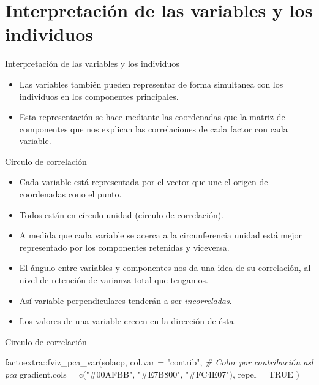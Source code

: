 \documentclass[
  ignorenonframetext,
]{beamer}
\newenvironment{Shaded}{\begin{snugshade}}{\end{snugshade}}
\newcommand{\AttributeTok}[1]{\textcolor[rgb]{0.77,0.63,0.00}{#1}}
\newcommand{\CommentTok}[1]{\textcolor[rgb]{0.56,0.35,0.01}{\textit{#1}}}
\newcommand{\ConstantTok}[1]{\textcolor[rgb]{0.00,0.00,0.00}{#1}}
\newcommand{\FunctionTok}[1]{\textcolor[rgb]{0.00,0.00,0.00}{#1}}
\newcommand{\NormalTok}[1]{#1}
\newcommand{\SpecialCharTok}[1]{\textcolor[rgb]{0.00,0.00,0.00}{#1}}
\newcommand{\StringTok}[1]{\textcolor[rgb]{0.31,0.60,0.02}{#1}}
\providecommand{\tightlist}{%
  \setlength{\itemsep}{0pt}\setlength{\parskip}{0pt}}
\begin{document}
\hypertarget{interpretaciuxf3n-de-las-variables-y-los-individuos}{%
\section{Interpretación de las variables y los
individuos}\label{interpretaciuxf3n-de-las-variables-y-los-individuos}}

\begin{frame}{Interpretación de las variables y los individuos}
\protect\hypertarget{interpretaciuxf3n-de-las-variables-y-los-individuos-1}{}
\begin{itemize}
\item
  Las variables también pueden representar de forma simultanea con los
  individuos en los componentes principales.
\item
  Esta representación se hace mediante las coordenadas que la matriz de
  componentes que nos explican las correlaciones de cada factor con cada
  variable.
\end{itemize}
\end{frame}

\begin{frame}{Circulo de correlación}
\protect\hypertarget{circulo-de-correlaciuxf3n}{}
\begin{itemize}
\tightlist
\item
  Cada variable está representada por el vector que une el origen de
  coordenadas cono el punto.
\item
  Todos están en círculo unidad (círculo de correlación).
\item
  A medida que cada variable se acerca a la circunferencia unidad está
  mejor representado por los componentes retenidas y viceversa.
\item
  El ángulo entre variables y componentes nos da una idea de su
  correlación, al nivel de retención de varianza total que tengamos.
\item
  Así variable perpendiculares tenderán a ser \emph{incorreladas}.
\item
  Los valores de una variable crecen en la dirección de ésta.
\end{itemize}
\end{frame}

\begin{frame}[fragile]{Circulo de correlación}
\protect\hypertarget{circulo-de-correlaciuxf3n-1}{}
\begin{Shaded}
\begin{Highlighting}[]
\NormalTok{factoextra}\SpecialCharTok{::}\FunctionTok{fviz\_pca\_var}\NormalTok{(solacp,}
             \AttributeTok{col.var =} \StringTok{"contrib"}\NormalTok{,}
             \CommentTok{\# Color por contribución asl pca}
             \AttributeTok{gradient.cols =} \FunctionTok{c}\NormalTok{(}\StringTok{"\#00AFBB"}\NormalTok{,}
                               \StringTok{"\#E7B800"}\NormalTok{,}
                               \StringTok{"\#FC4E07"}\NormalTok{),}
             \AttributeTok{repel =} \ConstantTok{TRUE}    
\NormalTok{             )}
\end{Highlighting}
\end{Shaded}
\end{frame}
\end{document}

